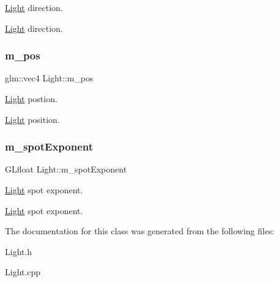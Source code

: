 \hyperlink{class_light}{Light} direction. 

\hyperlink{class_light}{Light} direction. \mbox{\label{class_light_a108cbac703d7fc2bc6eb39185d9bead9}} 
\subsubsection{\texorpdfstring{m\+\_\+pos}{m\_pos}}
{\footnotesize\ttfamily glm\+::vec4 Light\+::m\+\_\+pos\hspace{0.3cm}{\ttfamily [protected]}}



\hyperlink{class_light}{Light} postion. 

\hyperlink{class_light}{Light} position. \mbox{\label{class_light_a262000d67538f1a25613e18fe17668cd}} 
\subsubsection{\texorpdfstring{m\+\_\+spot\+Exponent}{m\_spotExponent}}
{\footnotesize\ttfamily G\+Lfloat Light\+::m\+\_\+spot\+Exponent\hspace{0.3cm}{\ttfamily [protected]}}



\hyperlink{class_light}{Light} spot exponent. 

\hyperlink{class_light}{Light} spot exponent. 

The documentation for this class was generated from the following files\+:\begin{DoxyCompactItemize}
\item 
Light.\+h\item 
Light.\+cpp\end{DoxyCompactItemize}
